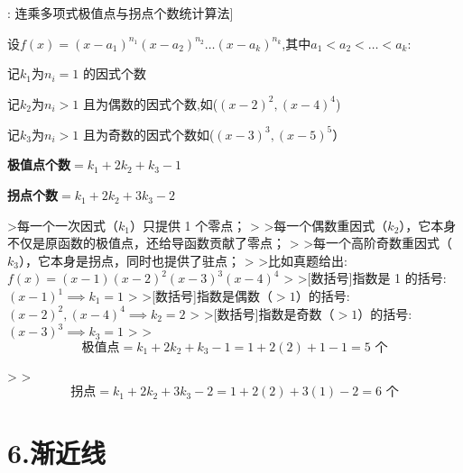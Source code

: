 \documentclass[11pt,a4paper,UTF8]{ctexart}
\begin{document}
\begin{thmbox}[结论[3]: 连乘多项式极值点与拐点个数统计算法]

设$f(x) = (x - a_1)^{n_1} (x - a_2)^{n_2} \dots (x - a_k)^{n_k}$,其中$a_1 < a_2 < \dots < a_k$:

  记$k_1$为$n_i = 1$ 的因式个数

  记$k_2$为$n_i > 1$ 且为偶数的因式个数,如($(x-2)^2, (x-4)^4$)

  记$k_3$为$n_i > 1$ 且为奇数的因式个数如($(x-3)^3, (x-5)^5$）

  \textbf{极值点个数}$= k_1 + 2k_2 + k_3 - 1$

  \textbf{拐点个数}$= k_1 + 2k_2 + 3k_3 - 2$

  >每一个一次因式（$k_1$）只提供 1 个零点；
  >
  >每一个偶数重因式（$k_2$），它本身不仅是原函数的极值点，还给导函数贡献了零点；
  >
  >每一个高阶奇数重因式（$k_3$），它本身是拐点，同时也提供了驻点；
  >
  >比如真题给出:$f(x) = (x-1)(x-2)^2(x-3)^3(x-4)^4$
  >
  >[数括号]指数是 1 的括号:$(x-1)^1 \implies k_1 = 1$
  >
  >[数括号]指数是偶数（$>1$）的括号:$(x-2)^2, (x-4)^4 \implies k_2 = 2$
  >
  >[数括号]指数是奇数（$>1$）的括号:$(x-3)^3 \implies k_3 = 1$
  >
  >
\begin{equation*}
\text{极值点} = k_1 + 2k_2 + k_3 - 1 = 1 + 2(2) + 1 - 1 = 5 \text{ 个}
\end{equation*}

  >
  >
\begin{equation*}
\text{拐点} = k_1 + 2k_2 + 3k_3 - 2 = 1 + 2(2) + 3(1) - 2 = 6 \text{ 个}
\end{equation*}


\end{thmbox}

\section{6.渐近线}
\end{document}
